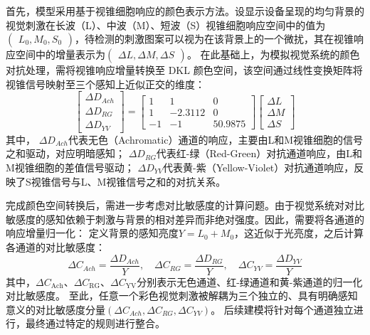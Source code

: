首先，模型采用基于视锥细胞响应的颜色表示方法。设显示设备呈现的均匀背景的视觉刺激在长波（L）、中波（M）、短波（S）视锥细胞响应空间中的值为$\begin{pmatrix}L_{0},M_{0},S_{0}\end{pmatrix}$，待检测的刺激图案可以视为在该背景上的一个微扰，其在视锥响应空间中的增量表示为$\begin{pmatrix}\Delta L,\Delta M,\Delta S\end{pmatrix}$。
在此基础上，为模拟视觉系统的颜色对抗处理，需将视锥响应增量转换至 DKL 颜色空间\cite{3-2}，该空间通过线性变换矩阵将视锥信号映射至三个感知上近似正交的维度：
\begin{equation}
\begin{bmatrix}
\Delta D_{Ach} \\
\Delta D_{RG} \\
\Delta D_{YV}
\end{bmatrix} = \begin{bmatrix}
1 & 1 & 0 \\
1 & - 2.3112 & 0 \\
 - 1 & - 1 & 50.9875
\end{bmatrix}\begin{bmatrix}
\Delta L \\
\Delta M \\
\Delta S
\end{bmatrix}
\label{eq:dkl_transform}
\end{equation}
其中， $\Delta D_{Ach}$代表无色（Achromatic）通道的响应，主要由L和M视锥细胞的信号之和驱动，对应明暗感知；
$\Delta D_{RG}$代表红-绿（Red-Green）对抗通道响应，由L和M视锥细胞的差值信号驱动；
$\Delta D_{YV}$代表黄-紫（Yellow-Violet）对抗通道响应，反映了S视锥信号与L、M视锥信号之和的对抗关系。

完成颜色空间转换后，需进一步考虑对比敏感度的计算问题。由于视觉系统对对比敏感度的感知依赖于刺激与背景的相对差异而非绝对强度。因此，需要将各通道的响应增量归一化：
定义背景的感知亮度$Y = L_{0} + M_{0}$，这近似于光亮度，之后计算各通道的对比敏感度：
\begin{equation}
\Delta C_{Ach} = \frac{\Delta D_{Ach}}{Y},\quad\Delta C_{RG} = \frac{\Delta D_{RG}}{Y},\quad\Delta C_{YV} = \frac{\Delta D_{YV}}{Y}
\label{eq:contrast_normalization}
\end{equation}
其中，\(\Delta C_{\text{Ach}}\)、\(\Delta C_{\text{RG}}\)、\(\Delta C_{\text{YV}}\)分别表示无色通道、红-绿通道和黄-紫通道的归一化对比敏感度。
至此，任意一个彩色视觉刺激被解耦为三个独立的、具有明确感知意义的对比敏感度分量\((\Delta C_{Ach}, \Delta C_{RG}, \Delta C_{YV})\)。
后续建模将针对每个通道独立进行，最终通过特定的规则进行整合。

